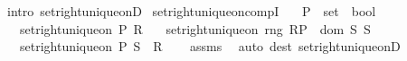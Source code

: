 \begin{isabellebody}
\ {\isacharparenleft}{\kern0pt}intro\ set{\isacharunderscore}{\kern0pt}right{\isacharunderscore}{\kern0pt}unique{\isacharunderscore}{\kern0pt}onD{\isacharparenright}{\kern0pt}\isanewline
{}\isamarkupfalse%
%
\endisatagproof
{\isafoldproof}%
%
\isadelimproof
\isanewline
%
\endisadelimproof
\isanewline
{}\isamarkupfalse%
\ set{\isacharunderscore}{\kern0pt}right{\isacharunderscore}{\kern0pt}unique{\isacharunderscore}{\kern0pt}on{\isacharunderscore}{\kern0pt}compI{\isacharcolon}{\kern0pt}\isanewline
\ \ \ P\ {\isacharcolon}{\kern0pt}{\isacharcolon}{\kern0pt}\ {\isachardoublequoteopen}set\ {\isasymRightarrow}\ bool{\isachardoublequoteclose}\isanewline
\ \ \ {\isachardoublequoteopen}set{\isacharunderscore}{\kern0pt}right{\isacharunderscore}{\kern0pt}unique{\isacharunderscore}{\kern0pt}on\ P\ R{\isachardoublequoteclose}\isanewline
\ \ \ {\isachardoublequoteopen}set{\isacharunderscore}{\kern0pt}right{\isacharunderscore}{\kern0pt}unique{\isacharunderscore}{\kern0pt}on\ {\isacharparenleft}{\kern0pt}rng\ {\isacharparenleft}{\kern0pt}R{\isasymrestriction}\isactrlbsub P\isactrlesub {\isacharparenright}{\kern0pt}\ {\isasyminter}\ dom\ S{\isacharparenright}{\kern0pt}\ S{\isachardoublequoteclose}\isanewline
\ \ \ {\isachardoublequoteopen}set{\isacharunderscore}{\kern0pt}right{\isacharunderscore}{\kern0pt}unique{\isacharunderscore}{\kern0pt}on\ P\ {\isacharparenleft}{\kern0pt}S\ {\isasymcirc}\ R{\isacharparenright}{\kern0pt}{\isachardoublequoteclose}\isanewline
%
\isadelimproof
\ \ %
\endisadelimproof
%
\isatagproof
{}\isamarkupfalse%
\ assms\ \isamarkupfalse%
\ {\isacharparenleft}{\kern0pt}auto\ dest{\isacharcolon}{\kern0pt}\ set{\isacharunderscore}{\kern0pt}right{\isacharunderscore}{\kern0pt}unique{\isacharunderscore}{\kern0pt}onD{\isacharparenright}{\kern0pt}%
\endisatagproof
{\isafoldproof}%
%
\isadelimproof
\isanewline
%
\endisadelimproof
\isanewline
%
\isadelimtheory
\isanewline
%
\endisadelimtheory
%
\isatagtheory
{}\isamarkupfalse%
%
\endisatagtheory
{\isafoldtheory}%
%
\isadelimtheory
%
\endisadelimtheory
%
\end{isabellebody}%
\endinput

